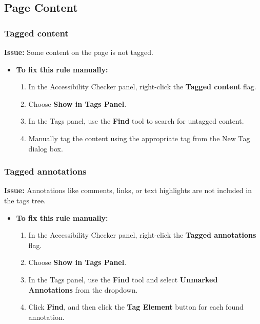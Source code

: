 \subsection{Page Content}
\label{subsec:pdf-page-content}

\subsubsection{Tagged content}
\label{ssubsec:pdf-tagged-content}

\textbf{Issue:} Some content on the page is not tagged.

\begin{itemize}
	\item \textbf{To fix this rule manually:}
	      \begin{enumerate}
		      \item In the Accessibility Checker panel, right-click the \textbf{Tagged content} flag.
		      \item Choose \textbf{Show in Tags Panel}.
		      \item In the Tags panel, use the \textbf{Find} tool to search for untagged content.
		      \item Manually tag the content using the appropriate tag from the New Tag dialog box.
	      \end{enumerate}
\end{itemize}

\subsubsection{Tagged annotations}
\label{ssubsec:pdf-tagged-annotations}

\textbf{Issue:} Annotations like comments, links, or text highlights are not included in the tags tree.

\begin{itemize}
	\item \textbf{To fix this rule manually:}
	      \begin{enumerate}
		      \item In the Accessibility Checker panel, right-click the \textbf{Tagged annotations} flag.
		      \item Choose \textbf{Show in Tags Panel}.
		      \item In the Tags panel, use the \textbf{Find} tool and select \textbf{Unmarked Annotations} from the dropdown.
		      \item Click \textbf{Find}, and then click the \textbf{Tag Element} button for each found annotation.
	      \end{enumerate}
\end{itemize}

